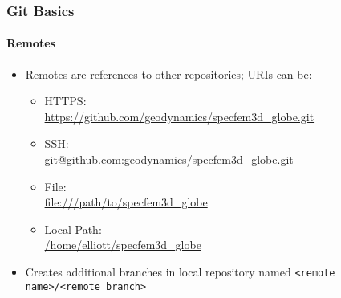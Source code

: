 \begin{frame}
 \frametitle{Git Basics}
 \framesubtitle{Remotes}

 \begin{itemize}
  \item \alert{Remotes} are references to other repositories; URIs can be:
   \begin{itemize}
    \item HTTPS:\\
      {\small \url{https://github.com/geodynamics/specfem3d_globe.git}}
    \item SSH:\\
      \url{git@github.com:geodynamics/specfem3d_globe.git}
    \item File:\\
      \url{file:///path/to/specfem3d_globe}
    \item Local Path:\\
      \url{/home/elliott/specfem3d_globe}
   \end{itemize}
  \item Creates additional branches in local repository named
        \texttt{<remote name>/<remote branch>}
 \end{itemize}
\end{frame}

